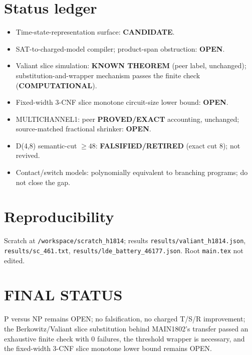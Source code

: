 \documentclass[11pt]{article}
\begin{document}
\section*{Status ledger}
\begin{itemize}
\item Time-state-representation surface: \textbf{CANDIDATE}.
\item SAT-to-charged-model compiler; product-span obstruction: \textbf{OPEN}.
\item Valiant slice simulation: \textbf{KNOWN THEOREM} (peer label, unchanged); substitution-and-wrapper mechanism passes the finite check (\textbf{COMPUTATIONAL}).
\item Fixed-width 3-CNF slice monotone circuit-size lower bound: \textbf{OPEN}.
\item MULTICHANNEL1: peer \textbf{PROVED/EXACT} accounting, unchanged; source-matched fractional shrinker: \textbf{OPEN}.
\item D(4,8) semantic-cut $\ge48$: \textbf{FALSIFIED/RETIRED} (exact cut 8); not revived.
\item Contact/switch models: polynomially equivalent to branching programs; do not close the gap.
\end{itemize}

\section*{Reproducibility}
Scratch at \texttt{/workspace/scratch\_h1814}; results \texttt{results/valiant\_h1814.json}, \texttt{results/sc\_461.txt}, \texttt{results/lde\_battery\_46177.json}. Root \texttt{main.tex} not edited.

\section*{FINAL STATUS}
P versus NP remains OPEN; no falsification, no charged T/S/R improvement; the Berkowitz/Valiant slice substitution behind MAIN1802's transfer passed an exhaustive finite check with 0 failures, the threshold wrapper is necessary, and the fixed-width 3-CNF slice monotone lower bound remains OPEN.
\end{document}
